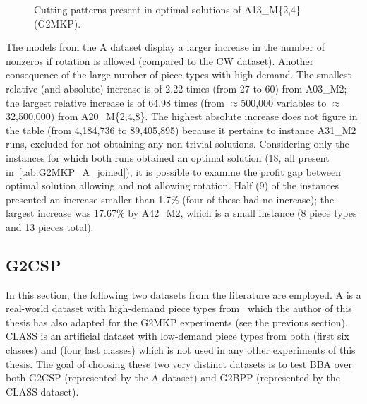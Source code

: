\begin{figure}[!t]
  \caption{Cutting patterns present in optimal solutions of A13\_M\{2,4\} (G2MKP).}
  \center
  
  \label{fig:g2mkp_a14_24}
\end{figure}

The models from the A dataset display a larger increase in the number of nonzeros if rotation is allowed (compared to the CW dataset).
Another consequence of the large number of piece types with high demand.
The smallest relative (and absolute) increase is of 2.22 times (from 27 to 60) from A03\_M2; the largest relative increase is of 64.98 times (from \(\approx\)500,000 variables to \(\approx\)32,500,000) from A20\_M\{2,4,8\}.
The highest absolute increase does not figure in the table (from 4,184,736 to 89,405,895) because it pertains to instance A31\_M2 runs, excluded for not obtaining any non-trivial solutions.
Considering only the instances for which both runs obtained an optimal solution (18, all present in~\cref{tab:G2MKP_A_joined}), it is possible to examine the profit gap between optimal solution allowing and not allowing rotation.
Half (9) of the instances presented an increase smaller than 1.7\% (four of these had no increase); the largest increase was 17.67\% by A42\_M2, which is a small instance (8 piece types and 13 pieces total).

\subsection{G2CSP}

In this section, the following two datasets from the literature are employed.
A is a real-world dataset with high-demand piece types from~\citet{macedo:2010} which the author of this thesis has also adapted for the G2MKP experiments (see the previous section).
CLASS is an artificial dataset with low-demand piece types from both \citet{berkey:1987} (first six classes) and \citet{fayard:1998} (four last classes) which is not used in any other experiments of this thesis.
The goal of choosing these two very distinct datasets is to test BBA over both G2CSP (represented by the A dataset) and G2BPP (represented by the CLASS dataset).

